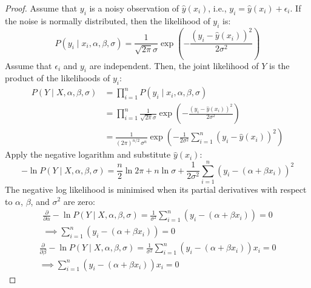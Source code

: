 \begin{thm}
  \begin{proof}
    Assume that $y_i$ is a noisy observation of $\hat{y}(x_i)$, i.e., $y_i =
      \hat{y}(x_i) + \epsilon_i$.
    If the noise is normally distributed, then the likelihood of $y_i$ is:
    \begin{equation}
      P(y_i \mid x_i, \alpha, \beta, \sigma) = \frac{1}{\sqrt{2 \pi} \sigma} \exp
      \left( - \frac{(y_i - \hat{y}(x_i))^2}{2 \sigma^2} \right)
    \end{equation}
    Assume that $\epsilon_i$ and $y_i$ are independent.
    Then, the joint likelihood of $Y$ is the product of the likelihoods of
    $y_i$:
    \begin{align}
      P(Y \mid X, \alpha, \beta, \sigma)
       & = \prod_{i = 1}^n P(y_i \mid x_i, \alpha, \beta, \sigma)
      \\
       & = \prod_{i = 1}^n \frac{1}{\sqrt{2 \pi} \sigma} \exp \left(
      - \frac{(y_i - \hat{y}(x_i))^2}{2 \sigma^2}
      \right)
      \\
       & = \frac{1}{(2 \pi)^{n / 2}\,\sigma^n} \exp \left(
      -\frac{1}{2\sigma^2} \sum_{i = 1}^{n} (y_i - \hat{y}(x_i))^2
      \right)
    \end{align}
    Apply the negative logarithm and substitute $\hat{y}(x_i)$:
    \begin{equation}
      - \ln P(Y \mid X, \alpha, \beta, \sigma)
      = \frac{n}{2}\ln 2\pi + n\ln\sigma + \frac{1}{2\sigma^2} \sum_{i = 1}^{n} (y_i - (\alpha + \beta x_i))^2
    \end{equation}
    The negative log likelihood is minimised when its partial derivatives with
    respect to $\alpha$, $\beta$, and $\sigma^2$ are zero:
    \begin{equation}
      \begin{split}
        \frac{\partial}{\partial \alpha} - \ln P(Y \mid X, \alpha, \beta, \sigma)
        = \frac{1}{\sigma^2} \sum_{i = 1}^{n} (y_i - (\alpha + \beta x_i)) = 0 \\
        \implies \sum_{i = 1}^{n} (y_i - (\alpha + \beta x_i)) = 0
      \end{split}
    \end{equation}
    \begin{equation}
      \begin{split}
        \frac{\partial}{\partial \beta} - \ln P(Y \mid X, \alpha, \beta, \sigma)
        = \frac{1}{\sigma^2} \sum_{i = 1}^{n} (y_i - (\alpha + \beta x_i)) x_i = 0 \\
        \implies \sum_{i = 1}^{n} (y_i - (\alpha + \beta x_i)) x_i = 0

\end{split}
\end{equation}
\end{proof}
\end{thm}
